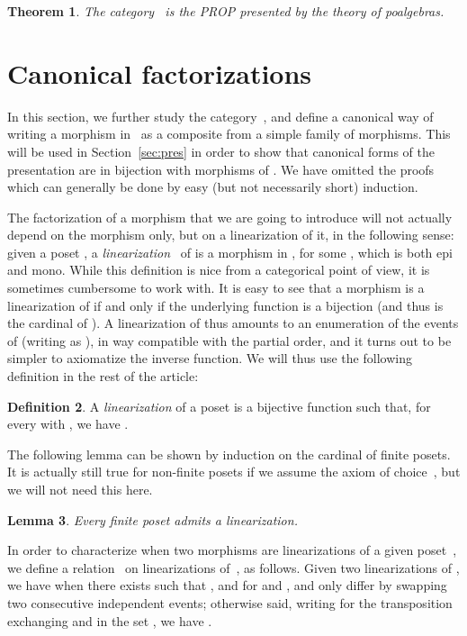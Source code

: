 \documentclass[submission,copyright,creativecommons]{eptcs}
\newtheorem{theorem}{Theorem}
\newtheorem{lemma}[theorem]{Lemma}
\theoremstyle{definition}
\newtheorem{definition}[theorem]{Definition}
\theoremstyle{remark}
\begin{document}
\begin{theorem}
  The category~ is the PROP presented by the theory of poalgebras.
\end{theorem}

\section{Canonical factorizations}
\label{sec:cf}
In this section, we further study the category~, and define a canonical way
of writing a morphism in~ as a composite from a simple family of
morphisms. This will be used in Section~\ref{sec:pres} in order to show that
canonical forms of the presentation are in bijection with morphisms of . We
have omitted the proofs which can generally be done by easy (but not necessarily
short) induction.

The factorization of a morphism that we are going to introduce will not actually
depend on the morphism only, but on a linearization of it, in the following
sense: given a poset , a \emph{linearization}~ of  is a
morphism  in , for some , which is both epi
and mono.
While this definition is nice from a categorical point of view, it is sometimes
cumbersome to work with. It is easy to see that a morphism
 is a linearization of  if and only if the underlying
function  is a bijection (and thus  is the
cardinal of ). A linearization of  thus amounts to an enumeration
 of the events of  (writing
 as ), in way compatible with the partial order, and it turns
out to be simpler to axiomatize the inverse function. We will thus use the
following definition in the rest of the article:

\begin{definition}
  \label{def:linearization}
  A \emph{linearization} of a poset  is a bijective function
   such that, for every  with
  , we have .
\end{definition}

\noindent
The following lemma can be shown by induction on the cardinal of finite
posets. It is actually still true for non-finite posets if we assume the axiom
of choice~\cite{szpilrajn1930extension}, but we will not need this here.

\begin{lemma}
  Every finite poset admits a linearization.
\end{lemma}

\noindent
In order to characterize when two morphisms are linearizations of a given
poset~, we define a relation~ on linearizations of~, as
follows. Given two linearizations  of , we have
 when there exists  such that ,
 and  for  and , \ie  and 
only differ by swapping two consecutive independent events; otherwise said,
writing  for the transposition exchanging 
and  in the set , we have .
\end{document}
